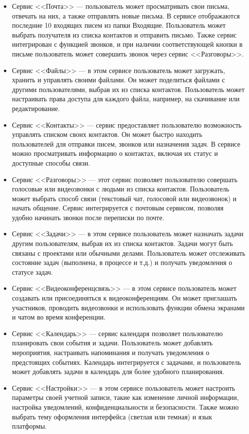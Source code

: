 \begin{itemize}
    \item Сервис <<Почта>> — пользователь может просматривать свои письма, отвечать на них, а также отправлять новые письма. В сервисе отображаются последние 10 входящих писем из папки Входящие. Пользователь может выбрать получателя из списка контактов и отправить письмо. Также сервис интегрирован с функцией звонков, и при наличии соответствующей кнопки в письме пользователь может совершить звонок через сервис <<Разговоры>>.
    
    \item Сервис <<Файлы>> — в этом сервисе пользователь может загружать, хранить и управлять своими файлами. Он может поделиться файлами с другими пользователями, выбрав их из списка контактов. Пользователь может настраивать права доступа для каждого файла, например, на скачивание или редактирование.

    \item Сервис <<Контакты>> — сервис предоставляет пользователю возможность управлять списком своих контактов. Он может быстро находить пользователей для отправки писем, звонков или назначения задач. В сервисе можно просматривать информацию о контактах, включая их статус и доступные способы связи.

    \item Сервис <<Разговоры>> — этот сервис позволяет пользователю совершать голосовые или видеозвонки с людьми из списка контактов. Пользователь может выбрать способ связи (текстовый чат, голосовой или видеозвонок) и начать общение. Сервис интегрируется с почтовым сервисом, позволяя удобно начинать звонки после переписки по почте.

    \item Сервис <<Задачи>> — в этом сервисе пользователь может назначать задачи другим пользователям, выбрав их из списка контактов. Задачи могут быть связаны с проектами или обычными делами. Пользователь может отслеживать состояние задач (выполнена, в процессе и т.д.) и получать уведомления о статусе задач.

    \item Сервис <<Видеоконференцсвязь>> — в этом сервисе пользователь может создавать или присоединяться к видеоконференциям. Он может приглашать участников, проводить видеозвонки и использовать функции обмена экранами и чатом во время конференции.

    \item Сервис <<Календарь>> — сервис календаря позволяет пользователю планировать свои события и задачи. Пользователь может добавлять мероприятия, настраивать напоминания и получать уведомления о предстоящих событиях. Календарь интегрируется с задачами, и пользователь может добавлять задачи в календарь для более удобного планирования.

    \item Сервис <<Настройки>> — в этом сервисе пользователь может настроить параметры своей учетной записи, такие как изменение личной информации, настройка уведомлений, конфиденциальности и безопасности. Также можно выбрать тему оформления интерфейса (светлая или темная) и язык платформы.
\end{itemize}

